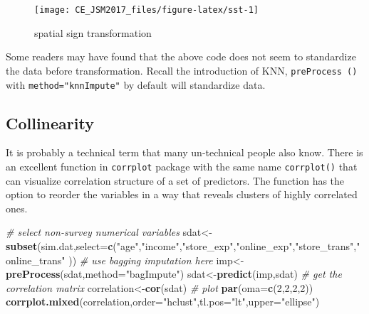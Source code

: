 \documentclass[
]{article}
\newenvironment{Shaded}{\begin{snugshade}}{\end{snugshade}}
\newcommand{\CommentTok}[1]{\textcolor[rgb]{0.56,0.35,0.01}{\textit{#1}}}
\newcommand{\DataTypeTok}[1]{\textcolor[rgb]{0.13,0.29,0.53}{#1}}
\newcommand{\DecValTok}[1]{\textcolor[rgb]{0.00,0.00,0.81}{#1}}
\newcommand{\KeywordTok}[1]{\textcolor[rgb]{0.13,0.29,0.53}{\textbf{#1}}}
\newcommand{\NormalTok}[1]{#1}
\newcommand{\StringTok}[1]{\textcolor[rgb]{0.31,0.60,0.02}{#1}}
\begin{document}
\begin{figure}

{\centering \texttt{[image: CE\_JSM2017\_files/figure-latex/sst-1]} 

}

\caption{spatial sign transformation}\label{fig:sst}
\end{figure}

Some readers may have found that the above code does not seem to
standardize the data before transformation. Recall the introduction of
KNN, \texttt{preProcess\ ()} with \texttt{method="knnImpute"} by default
will standardize data.

\hypertarget{collinearity}{%
\subsection{Collinearity}\label{collinearity}}

It is probably a technical term that many un-technical people also know.
There is an excellent function in \texttt{corrplot} package with the
same name \texttt{corrplot()} that can visualize correlation structure
of a set of predictors. The function has the option to reorder the
variables in a way that reveals clusters of highly correlated ones.

\begin{Shaded}
\begin{Highlighting}[]
\CommentTok{# select non-survey numerical variables}
\NormalTok{sdat<-}\KeywordTok{subset}\NormalTok{(sim.dat,}\DataTypeTok{select=}\KeywordTok{c}\NormalTok{(}\StringTok{"age"}\NormalTok{,}\StringTok{"income"}\NormalTok{,}\StringTok{"store_exp"}\NormalTok{,}\StringTok{"online_exp"}\NormalTok{,}\StringTok{"store_trans"}\NormalTok{,}\StringTok{"online_trans"}\NormalTok{ ))}
\CommentTok{# use bagging imputation here}
\NormalTok{imp<-}\KeywordTok{preProcess}\NormalTok{(sdat,}\DataTypeTok{method=}\StringTok{"bagImpute"}\NormalTok{)}
\NormalTok{sdat<-}\KeywordTok{predict}\NormalTok{(imp,sdat)}
\CommentTok{# get the correlation matrix}
\NormalTok{correlation<-}\KeywordTok{cor}\NormalTok{(sdat)}
\CommentTok{# plot }
\KeywordTok{par}\NormalTok{(}\DataTypeTok{oma=}\KeywordTok{c}\NormalTok{(}\DecValTok{2}\NormalTok{,}\DecValTok{2}\NormalTok{,}\DecValTok{2}\NormalTok{,}\DecValTok{2}\NormalTok{))}
\KeywordTok{corrplot.mixed}\NormalTok{(correlation,}\DataTypeTok{order=}\StringTok{"hclust"}\NormalTok{,}\DataTypeTok{tl.pos=}\StringTok{"lt"}\NormalTok{,}\DataTypeTok{upper=}\StringTok{"ellipse"}\NormalTok{)}
\end{Highlighting}
\end{Shaded}
\end{document}
